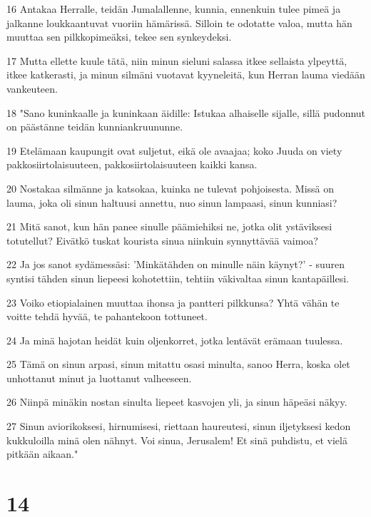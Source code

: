 \par 16 Antakaa Herralle, teidän Jumalallenne, kunnia, ennenkuin tulee pimeä ja jalkanne loukkaantuvat vuoriin hämärissä. Silloin te odotatte valoa, mutta hän muuttaa sen pilkkopimeäksi, tekee sen synkeydeksi.
\par 17 Mutta ellette kuule tätä, niin minun sieluni salassa itkee sellaista ylpeyttä, itkee katkerasti, ja minun silmäni vuotavat kyyneleitä, kun Herran lauma viedään vankeuteen.
\par 18 "Sano kuninkaalle ja kuninkaan äidille: Istukaa alhaiselle sijalle, sillä pudonnut on päästänne teidän kunniankruununne.
\par 19 Etelämaan kaupungit ovat suljetut, eikä ole avaajaa; koko Juuda on viety pakkosiirtolaisuuteen, pakkosiirtolaisuuteen kaikki kansa.
\par 20 Nostakaa silmänne ja katsokaa, kuinka ne tulevat pohjoisesta. Missä on lauma, joka oli sinun haltuusi annettu, nuo sinun lampaasi, sinun kunniasi?
\par 21 Mitä sanot, kun hän panee sinulle päämiehiksi ne, jotka olit ystäviksesi totutellut? Eivätkö tuskat kourista sinua niinkuin synnyttävää vaimoa?
\par 22 Ja jos sanot sydämessäsi: 'Minkätähden on minulle näin käynyt?' - suuren syntisi tähden sinun liepeesi kohotettiin, tehtiin väkivaltaa sinun kantapäillesi.
\par 23 Voiko etiopialainen muuttaa ihonsa ja pantteri pilkkunsa? Yhtä vähän te voitte tehdä hyvää, te pahantekoon tottuneet.
\par 24 Ja minä hajotan heidät kuin oljenkorret, jotka lentävät erämaan tuulessa.
\par 25 Tämä on sinun arpasi, sinun mitattu osasi minulta, sanoo Herra, koska olet unhottanut minut ja luottanut valheeseen.
\par 26 Niinpä minäkin nostan sinulta liepeet kasvojen yli, ja sinun häpeäsi näkyy.
\par 27 Sinun aviorikoksesi, hirnumisesi, riettaan haureutesi, sinun iljetyksesi kedon kukkuloilla minä olen nähnyt. Voi sinua, Jerusalem! Et sinä puhdistu, et vielä pitkään aikaan."

\chapter{14}

